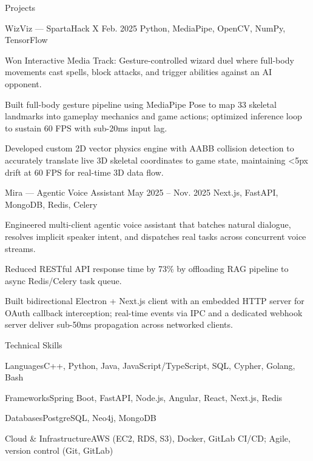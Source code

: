 \documentclass[
	11pt
]{../../../resume}
\begin{document}
	\begin{rSection}{P}{rojects}
		\begin{rSectionEntry}
			{WizViz --- SpartaHack X}
			{Feb. 2025}
			{}
			{Python, MediaPipe, OpenCV, NumPy, TensorFlow}
			{}

			\item Won Interactive Media Track: Gesture-controlled wizard duel where full-body movements cast spells, block attacks, and trigger abilities against an AI opponent.
			\item Built full-body gesture pipeline using MediaPipe Pose to map 33 skeletal landmarks into gameplay mechanics and game actions; optimized inference loop to sustain 60 FPS with sub-20ms input lag.
			\item Developed custom 2D vector physics engine with AABB collision detection to accurately translate live 3D skeletal coordinates to game state, maintaining \textless5px drift at 60 FPS for real-time 3D data flow.
		\end{rSectionEntry}

		\begin{rSectionEntry}
			{Mira --- Agentic Voice Assistant}
			{May 2025 -- Nov. 2025}
			{}
			{Next.js, FastAPI, MongoDB, Redis, Celery}
			{}

			\item Engineered multi-client agentic voice assistant that batches natural dialogue, resolves implicit speaker intent, and dispatches real tasks across concurrent voice streams.
			\item Reduced RESTful API response time by 73\% by offloading RAG pipeline to async Redis/Celery task queue.
			\item Built bidirectional Electron + Next.js client with an embedded HTTP server for OAuth callback interception; real-time events via IPC and a dedicated webhook server deliver sub-50ms propagation across networked clients.
		\end{rSectionEntry}
	\end{rSection}

	\begin{rSection}{T}{echnical Skills}
		\begin{rSet}{Languages}{C++, Python, Java, JavaScript/TypeScript, SQL, Cypher, Golang, Bash}
		\end{rSet}
		\begin{rSet}{Frameworks}{Spring Boot, FastAPI, Node.js, Angular, React, Next.js, Redis}
		\end{rSet}
		\begin{rSet}{Databases}{PostgreSQL, Neo4j, MongoDB}
		\end{rSet}
		\begin{rSet}{Cloud \& Infrastructure}{AWS (EC2, RDS, S3), Docker, GitLab CI/CD; Agile, version control (Git, GitLab)}
		\end{rSet}
	\end{rSection}
\end{document}
